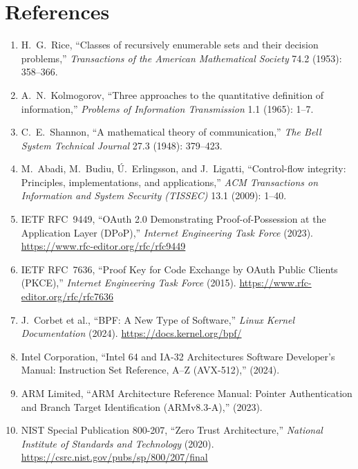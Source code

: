 \documentclass{portalciencia}
\theoremstyle{plain}
\theoremstyle{definition}
\newcommand{\reflink}[1]{\href{#1}{\footnotesize\url{#1}}}
\begin{document}
\section{References}

\begin{enumerate}
  \item H.~G.~Rice, ``Classes of recursively enumerable sets and their decision problems,'' \emph{Transactions of the American Mathematical Society} 74.2 (1953): 358--366.

  \item A.~N.~Kolmogorov, ``Three approaches to the quantitative definition of information,'' \emph{Problems of Information Transmission} 1.1 (1965): 1--7.

  \item C.~E.~Shannon, ``A mathematical theory of communication,'' \emph{The Bell System Technical Journal} 27.3 (1948): 379--423.

  \item M.~Abadi, M.~Budiu, \'U.~Erlingsson, and J.~Ligatti, ``Control-flow integrity: Principles, implementations, and applications,'' \emph{ACM Transactions on Information and System Security (TISSEC)} 13.1 (2009): 1--40.

  \item IETF RFC~9449, ``OAuth 2.0 Demonstrating Proof-of-Possession at the Application Layer (DPoP),'' \emph{Internet Engineering Task Force} (2023). \reflink{https://www.rfc-editor.org/rfc/rfc9449}

  \item IETF RFC~7636, ``Proof Key for Code Exchange by OAuth Public Clients (PKCE),'' \emph{Internet Engineering Task Force} (2015). \reflink{https://www.rfc-editor.org/rfc/rfc7636}

  \item J.~Corbet et al., ``BPF: A New Type of Software,'' \emph{Linux Kernel Documentation} (2024). \reflink{https://docs.kernel.org/bpf/}

  \item Intel Corporation, ``Intel 64 and IA-32 Architectures Software Developer's Manual: Instruction Set Reference, A--Z (AVX-512),'' (2024).

  \item ARM Limited, ``ARM Architecture Reference Manual: Pointer Authentication and Branch Target Identification (ARMv8.3-A),'' (2023).

  \item NIST Special Publication 800-207, ``Zero Trust Architecture,'' \emph{National Institute of Standards and Technology} (2020). \reflink{https://csrc.nist.gov/pubs/sp/800/207/final}


\end{enumerate}
\end{document}
